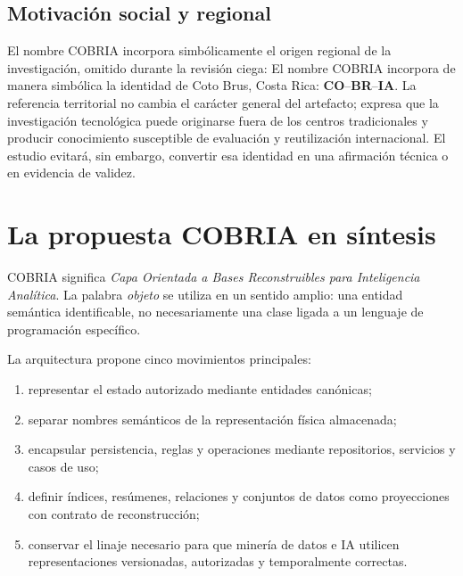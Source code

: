 \subsection{Motivación social y regional}

\ifnum{}
El nombre COBRIA incorpora simbólicamente el origen regional de la investigación,
omitido durante la revisión ciega:
\else
El nombre COBRIA incorpora de manera simbólica la identidad de Coto Brus, Costa Rica:
\fi
\textbf{CO}--\textbf{BR}--\textbf{IA}. La referencia territorial no cambia el carácter
general del artefacto; expresa que la investigación tecnológica puede originarse fuera
de los centros tradicionales y producir conocimiento susceptible de evaluación y
reutilización internacional. El estudio evitará, sin embargo, convertir esa identidad
en una afirmación técnica o en evidencia de validez.

\section{La propuesta COBRIA en síntesis}

COBRIA significa \emph{Capa Orientada a Bases Reconstruibles para Inteligencia
Analítica}. La palabra \emph{objeto} se utiliza en un
sentido amplio: una entidad semántica identificable, no necesariamente una clase ligada
a un lenguaje de programación específico.

La arquitectura propone cinco movimientos principales:

\begin{enumerate}[leftmargin=*]
  \item representar el estado autorizado mediante entidades canónicas;
  \item separar nombres semánticos de la representación física almacenada;
  \item encapsular persistencia, reglas y operaciones mediante repositorios, servicios
  y casos de uso;
  \item definir índices, resúmenes, relaciones y conjuntos de datos como proyecciones con contrato
  de reconstrucción;
  \item conservar el linaje necesario para que minería de datos e IA utilicen
  representaciones versionadas, autorizadas y temporalmente correctas.
\end{enumerate}

